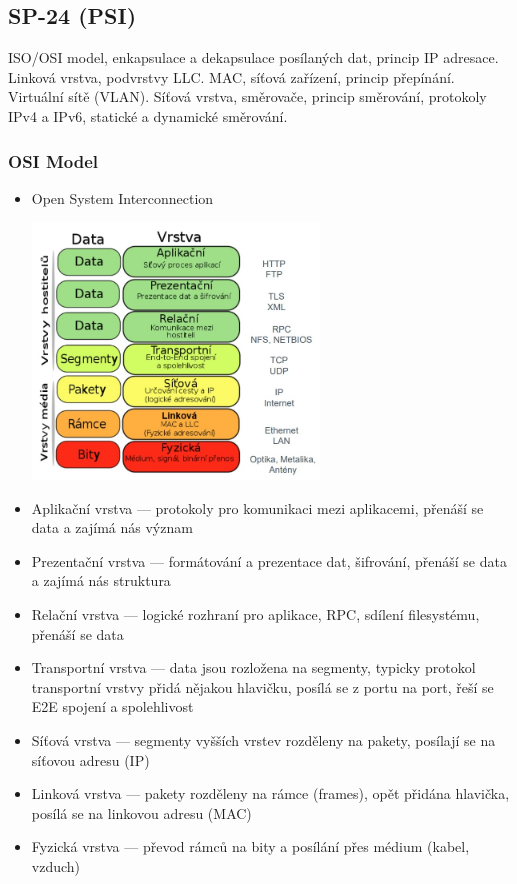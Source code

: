 \subsection{SP-24 (PSI)}
ISO/OSI model, enkapsulace a dekapsulace posílaných dat, princip IP adresace. Linková vrstva, podvrstvy LLC. MAC, síťová zařízení, princip přepínání. Virtuální sítě (VLAN). Síťová vrstva, směrovače, princip směrování, protokoly IPv4 a IPv6, statické a dynamické směrování.

\subsubsection*{OSI Model}
\begin{itemize}
	\item Open System Interconnection
	
	\includegraphics[width=0.6\textwidth]{img/SP-24_0.jpg}
	
	\item Aplikační vrstva --- protokoly pro komunikaci mezi aplikacemi, přenáší se data a zajímá nás význam
	\item Prezentační vrstva --- formátování a prezentace dat, šifrování, přenáší se data a zajímá nás struktura
	\item Relační vrstva --- logické rozhraní pro aplikace, RPC, sdílení filesystému, přenáší se data
	\item Transportní vrstva --- data jsou rozložena na segmenty, typicky protokol transportní vrstvy přidá nějakou hlavičku, posílá se z portu na port, řeší se E2E spojení a spolehlivost
	\item Síťová vrstva --- segmenty vyšších vrstev rozděleny na pakety, posílají se na síťovou adresu (IP)
	\item Linková vrstva --- pakety rozděleny na rámce (frames), opět přidána hlavička, posílá se na linkovou adresu (MAC)
	\item Fyzická vrstva --- převod rámců na bity a posílání přes médium (kabel, vzduch)
	
\end{itemize}

